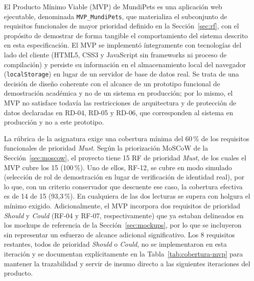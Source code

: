 \documentclass[journal,onecolumn]{IEEEtran}
\begin{document}
	El Producto Mínimo Viable (MVP) de MundiPets es una aplicación web
	ejecutable, denominada \texttt{MVP\_MundiPets}, que materializa el
	subconjunto de requisitos funcionales de mayor prioridad definido en la
	Sección~\ref{sec:rf}, con el propósito de demostrar de forma tangible el
	comportamiento del sistema descrito en esta especificación. El MVP se
	implementó íntegramente con tecnologías del lado del cliente (HTML5, CSS3 y
	JavaScript sin frameworks ni proceso de compilación) y persiste su
	información en el almacenamiento local del navegador
	(\texttt{localStorage}) en lugar de un servidor de base de datos real. Se
	trata de una decisión de diseño coherente con el alcance de un prototipo
	funcional de demostración académica y no de un sistema en producción; por
	lo mismo, el MVP no satisface todavía las restricciones de arquitectura y
	de protección de datos declaradas en RD-04, RD-05 y RD-06, que
	corresponden al sistema en producción y no a este prototipo.
	
	La rúbrica de la asignatura exige una cobertura mínima del 60\,\% de los
	requisitos funcionales de prioridad \emph{Must}. Según la priorización
	MoSCoW de la Sección~\ref{sec:moscow}, el proyecto tiene 15 RF de prioridad
	\emph{Must}, de los cuales el MVP cubre los 15 (100\,\%). Uno de ellos,
	RF-12, se cubre en modo simulado (selección de rol de demostración en lugar
	de verificación de identidad real), por lo que, con un criterio conservador
	que descuente ese caso, la cobertura efectiva es de 14 de 15
	(93,3\,\%). En cualquiera de las dos lecturas se supera con holgura el
	mínimo exigido. Adicionalmente, el MVP incorpora dos requisitos de
	prioridad \emph{Should} y \emph{Could} (RF-04 y RF-07, respectivamente) que
	ya estaban delineados en los mockups de referencia de la
	Sección~\ref{sec:mockups}, por lo que se incluyeron sin
	representar un esfuerzo de alcance adicional significativo. Los 8 requisitos
	restantes, todos de prioridad \emph{Should} o \emph{Could}, no se
	implementaron en esta iteración y se documentan explícitamente en la
	Tabla~\ref{tab:cobertura-mvp} para mantener la trazabilidad y servir de
	insumo directo a las siguientes iteraciones del producto.
	
\end{document}
